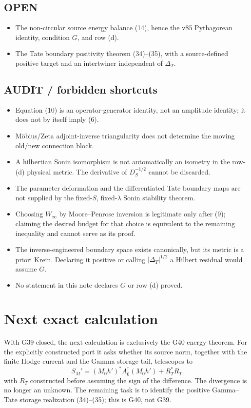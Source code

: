 \documentclass[11pt]{article}
\begin{document}
\subsection*{OPEN}
\begin{itemize}
\item The non-circular source energy balance (14), hence the v85 Pythagorean
      identity, condition $G$, and row (d).
\item The Tate boundary positivity theorem (34)--(35), with a source-defined
      positive target and an intertwiner independent of $\Delta_T$.
\end{itemize}

\subsection*{AUDIT / forbidden shortcuts}
\begin{itemize}
\item Equation (10) is an operator-generator identity, not an amplitude
      identity; it does not by itself imply (6).
\item Möbius/Zeta adjoint-inverse triangularity does not determine the moving
      old/new connection block.
\item A hilbertian Sonin isomorphism is not automatically an isometry in the
      row-(d) physical metric.  The derivative of $D_S^{-1/2}$ cannot be
      discarded.
\item The parameter deformation and the differentiated Tate boundary maps are
      not supplied by the fixed-$S$, fixed-$\lambda$ Sonin stability theorem.
\item Choosing $W_\infty$ by Moore--Penrose inversion is legitimate only after
      (9); claiming the desired budget for that choice is equivalent to the
      remaining inequality and cannot serve as its proof.
\item The inverse-engineered boundary space exists canonically, but its metric
      is a priori Krein.  Declaring it positive or calling
      $|\Delta_T|^{1/2}$ a Hilbert residual would assume $G$.
\item No statement in this note declares $G$ or row (d) proved.
\end{itemize}

\section{Next exact calculation}
With G39 closed, the next calculation is exclusively the G40 energy theorem.
For the explicitly constructed port it asks whether its source norm, together
with the finite Hodge current and the Gamma storage tail, telescopes to
\[
 S_M'=(M_0h')^*A_0^\dagger(M_0h')+R_T^*R_T
\]
with $R_T$ constructed before assuming the sign of the difference.  The
divergence is no longer an unknown.  The remaining task is to identify the
positive Gamma--Tate storage realization (34)--(35); this is G40, not G39.
\end{document}
